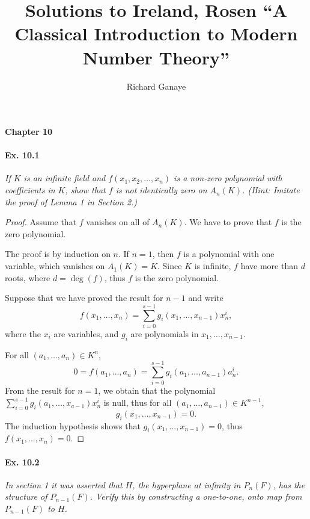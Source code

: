 \documentclass[11pt,a4paper]{article}
\title{Solutions to Ireland, Rosen ``A Classical Introduction to Modern Number Theory''}
\author{Richard Ganaye}
\begin{document}
{ \Large \bf Chapter 10} 

\paragraph{Ex. 10.1}

{\it If $K$ is an infinite field and $f(x_1,x_2,\ldots,x_n)$ is a non-zero polynomial with coefficients in $K$, show that $f$ is not identically zero on $A_n(K)$. (Hint: Imitate the proof of Lemma 1 in Section 2.)
}

\begin{proof}
Assume that $f$ vanishes on all of $A_n(K)$. We have to prove that $f$ is the zero polynomial.

The proof is by induction on $n$. If $n=1$, then $f$ is a polynomial with one variable, which vanishes on $A_1(K) = K$. Since $K$ is infinite, $f$ have more than $d$ roots, where $d = \deg(f)$, thus $f$ is the zero polynomial.

Suppose that we have proved the result for $n-1$ and write
$$f(x_1,\ldots,x_n) = \sum_{i=0}^{s-1} g_i(x_1,\ldots,x_{n-1}) x_n^i,$$
where the $x_i$ are variables, and $g_i$ are polynomials in $x_1,\ldots,x_{n-1}$.

For all $(a_1,\ldots,a_n) \in K^n$, 
$$0 = f(a_1,\ldots,a_n) = \sum_{i=0}^{s-1} g_i(a_1,\ldots,a_{n-1}) a_n^i.$$
From the result for $n=1$, we obtain that the polynomial $ \sum_{i=0}^{s-1} g_i(a_1,\ldots,x_{a-1}) x_n^i$ is null, thus for all $(a_1,\ldots,a_{n-1}) \in K^{n-1}$,
$$ g_i(x_1,\ldots,x_{n-1}) = 0.$$
The induction hypothesis shows that $ g_i(x_1,\ldots,x_{n-1}) = 0$, thus $f(x_1,\ldots,x_n) = 0$.
\end{proof}

\paragraph{Ex. 10.2}
{\it In section 1 it was asserted that $H$, the hyperplane at infinity in $P_n(F)$, has the structure of $P_{n-1}(F)$. Verify this by constructing a one-to-one, onto map from $P_{n-1}(F)$ to $H$.}
\end{document}
